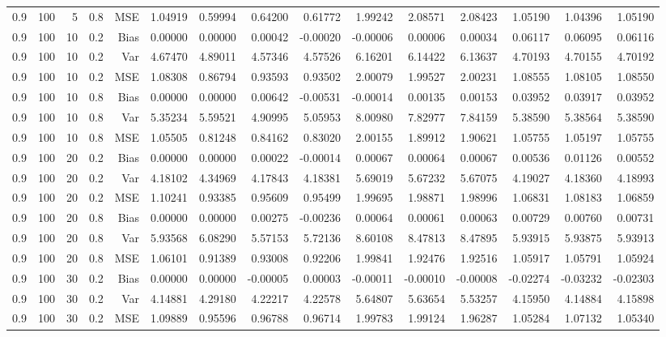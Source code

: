 \begin{table}[!htbp]
\begin{tabular}{lrrrrrrrrrrrrrr}
0.9 & 100 &  5 & 0.8 & MSE & 1.04919 & 0.59994 & 0.64200 & 0.61772 & 1.99242 & 2.08571 & 2.08423 & 1.05190 & 1.04396 & 1.05190 \\
0.9 & 100 & 10 & 0.2 & Bias & 0.00000 & 0.00000 & 0.00042 & -0.00020 & -0.00006 & 0.00006 & 0.00034 & 0.06117 & 0.06095 & 0.06116 \\
0.9 & 100 & 10 & 0.2 & Var & 4.67470 & 4.89011 & 4.57346 & 4.57526 & 6.16201 & 6.14422 & 6.13637 & 4.70193 & 4.70155 & 4.70192 \\
0.9 & 100 & 10 & 0.2 & MSE & 1.08308 & 0.86794 & 0.93593 & 0.93502 & 2.00079 & 1.99527 & 2.00231 & 1.08555 & 1.08105 & 1.08550 \\
0.9 & 100 & 10 & 0.8 & Bias & 0.00000 & 0.00000 & 0.00642 & -0.00531 & -0.00014 & 0.00135 & 0.00153 & 0.03952 & 0.03917 & 0.03952 \\
0.9 & 100 & 10 & 0.8 & Var & 5.35234 & 5.59521 & 4.90995 & 5.05953 & 8.00980 & 7.82977 & 7.84159 & 5.38590 & 5.38564 & 5.38590 \\
0.9 & 100 & 10 & 0.8 & MSE & 1.05505 & 0.81248 & 0.84162 & 0.83020 & 2.00155 & 1.89912 & 1.90621 & 1.05755 & 1.05197 & 1.05755 \\
0.9 & 100 & 20 & 0.2 & Bias & 0.00000 & 0.00000 & 0.00022 & -0.00014 & 0.00067 & 0.00064 & 0.00067 & 0.00536 & 0.01126 & 0.00552 \\
0.9 & 100 & 20 & 0.2 & Var & 4.18102 & 4.34969 & 4.17843 & 4.18381 & 5.69019 & 5.67232 & 5.67075 & 4.19027 & 4.18360 & 4.18993 \\
0.9 & 100 & 20 & 0.2 & MSE & 1.10241 & 0.93385 & 0.95609 & 0.95499 & 1.99695 & 1.98871 & 1.98996 & 1.06831 & 1.08183 & 1.06859 \\
0.9 & 100 & 20 & 0.8 & Bias & 0.00000 & 0.00000 & 0.00275 & -0.00236 & 0.00064 & 0.00061 & 0.00063 & 0.00729 & 0.00760 & 0.00731 \\
0.9 & 100 & 20 & 0.8 & Var & 5.93568 & 6.08290 & 5.57153 & 5.72136 & 8.60108 & 8.47813 & 8.47895 & 5.93915 & 5.93875 & 5.93913 \\
0.9 & 100 & 20 & 0.8 & MSE & 1.06101 & 0.91389 & 0.93008 & 0.92206 & 1.99841 & 1.92476 & 1.92516 & 1.05917 & 1.05791 & 1.05924 \\
0.9 & 100 & 30 & 0.2 & Bias & 0.00000 & 0.00000 & -0.00005 & 0.00003 & -0.00011 & -0.00010 & -0.00008 & -0.02274 & -0.03232 & -0.02303 \\
0.9 & 100 & 30 & 0.2 & Var & 4.14881 & 4.29180 & 4.22217 & 4.22578 & 5.64807 & 5.63654 & 5.53257 & 4.15950 & 4.14884 & 4.15898 \\
0.9 & 100 & 30 & 0.2 & MSE & 1.09889 & 0.95596 & 0.96788 & 0.96714 & 1.99783 & 1.99124 & 1.96287 & 1.05284 & 1.07132 & 1.05340 \\

\end{tabular}
\end{table}
